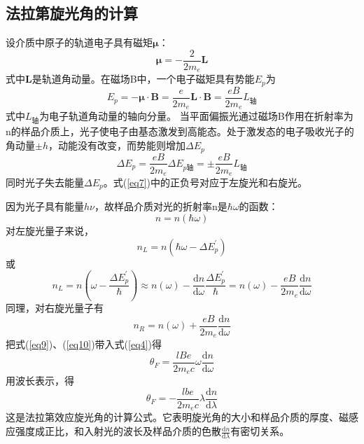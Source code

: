 \documentclass[a4paper]{article}
\begin{document}
\subsection{法拉第旋光角的计算}
设介质中原子的轨道电子具有磁矩$\mathbf{\mu}$：
\begin{equation}
\mathbf{\mu} = -\frac{2}{2m_e}\mathbf{L}\label{eq5}
\end{equation}
式中$\mathbf{L}$是轨道角动量。在磁场B中，一个电子磁矩具有势能$E_p$为
\begin{equation}
E_p = -\mathbf{\mu}\cdot\mathbf{B} = \frac{e}{2m_e}\mathbf{L}\cdot\mathbf{B} = \frac{eB}{2m_e}L_{\text{轴}}\label{eq6}
\end{equation}
式中$L_{\text{轴}}$为电子轨道角动量的轴向分量。
当平面偏振光通过磁场B作用在折射率为n的样品介质上，光子使电子由基态激发到高能态。处于激发态的电子吸收光子的角动量$\pm h$，动能没有改变，而势能则增加$\Delta E_p$
\begin{equation}
\Delta E_p = \frac{eB}{2m_e}\Delta E_{p\text{轴}} = \pm\frac{eB}{2m_e}L_{\text{轴}}\label{eq7}
\end{equation}
同时光子失去能量$\Delta E_p$。式(\ref{eq7})中的正负号对应于左旋光和右旋光。

因为光子具有能量$h\nu$，故样品介质对光的折射率n是$\hbar\omega$的函数：
\begin{equation}
n = n(\hbar\omega)\label{eq8}
\end{equation}
对左旋光量子来说，
\begin{equation*}
n_L = n(\hbar\omega - \Delta E_p^{'})
\end{equation*}
或
\begin{equation}
n_L = n\left(\omega - \frac{\Delta E_p^{'}}{\hbar}\right)\approx n(\omega) - \frac{\text{d}n}{\text{d}\omega}\frac{\Delta E_p^{'}}{\hbar} = n(\omega) - \frac{eB}{2m_e}\frac{\text{d}n}{\text{d}\omega}\label{eq9}
\end{equation}
同理，对右旋光量子有
\begin{equation}
n_R = n(\omega)+\frac{eB}{2m_e}\frac{\text{d}n}{\text{d}\omega}\label{eq10}
\end{equation}
把式(\ref{eq9})、(\ref{eq10})带入式(\ref{eq4})得
\begin{equation}
\theta_F = \frac{lBe}{2m_ec}\omega\frac{\text{d}n}{\text{d}\omega}\label{eq11}
\end{equation}
用波长表示，得
\begin{equation}
\theta_F = -\frac{lbe}{2m_ec}\lambda\frac{\text{d}n}{\text{d}\lambda}\label{eq12}
\end{equation}
这是法拉第效应旋光角的计算公式。它表明旋光角的大小和样品介质的厚度、磁感应强度成正比，和入射光的波长及样品介质的色散$\frac{\text{d}n}{\text{d}\lambda}$有密切关系。
\end{document}
